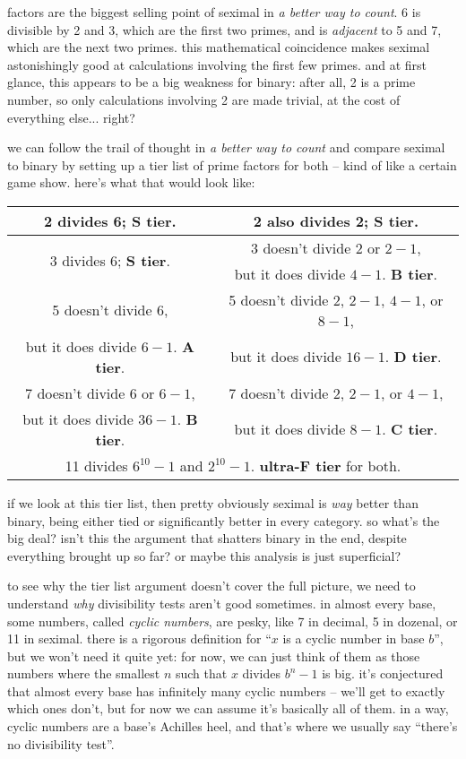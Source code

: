 \documentclass[../best.tex]{subfiles}
\begin{document}
factors are the biggest selling point of seximal in {\it a better way to count}. 6 is divisible by 2 and 3, which are the first two primes, and is \emph{adjacent} to 5 and 7, which are the next two primes. this mathematical coincidence makes seximal astonishingly good at calculations involving the first few primes. and at first glance, this appears to be a big weakness for binary: after all, 2 is a prime number, so only calculations involving 2 are made trivial, at the cost of everything else... right?

we can follow the trail of thought in {\it a better way to count} and compare seximal to binary by setting up a tier list of prime factors for both -- kind of like a certain game show. here's what that would look like:

\begin{center}
	\begin{tabular}{|c|c|}
		\hline
		2 divides 6; {\bf S tier}. &
		2 also divides 2; {\bf S tier}. \\
		\hline
		\multirow{2}{*}{3 divides 6; {\bf S tier}.} &
		3 doesn't divide 2 or $2 - 1$, \\
		&
		but it does divide $4 - 1$. {\bf B tier}. \\
		\hline
		5 doesn't divide 6, &
		5 doesn't divide 2, $2 - 1$, $4 - 1$, or $8 - 1$, \\
		but it does divide $6 - 1$. {\bf A tier}. &
		but it does divide $16 - 1$. {\bf D tier}. \\
		\hline
		7 doesn't divide 6 or $6 - 1$, &
		7 doesn't divide 2, $2 - 1$, or $4 - 1$, \\
		but it does divide $36 - 1$. {\bf B tier}. &
		but it does divide $8 - 1$. {\bf C tier}. \\
		\hline
		\multicolumn{2}{|c|}{11 divides $6^{10} - 1$ and $2^{10} - 1$.
		{\bf ultra-F tier} for both.} \\
		\hline
	\end{tabular}
\end{center}

\bigskip

if we look at this tier list, then pretty obviously seximal is \emph{way} better than binary, being either tied or significantly better in every category. so what's the big deal? isn't this the argument that shatters binary in the end, despite everything brought up so far? or maybe this analysis is just superficial?\myfootnote{}

to see why the tier list argument doesn't cover the full picture, we need to understand \emph{why} divisibility tests aren't good sometimes. in almost every base, some numbers, called \emph{cyclic numbers}, are pesky, like 7 in decimal, 5 in dozenal, or 11 in seximal. there is a rigorous definition for ``$x$ is a cyclic number in base $b$'', but we won't need it quite yet: for now, we can just think of them as those numbers where the smallest $n$ such that $x$ divides $b^n - 1$ is big. it's conjectured that almost every base has infinitely many cyclic numbers -- we'll get to exactly which ones don't, but for now we can assume it's basically all of them. in a way, cyclic numbers are a base's Achilles heel, and that's where we usually say ``there's no divisibility test''.
\end{document}
